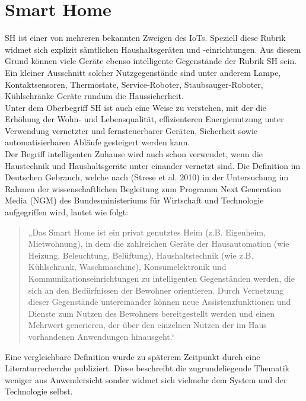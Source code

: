 \section{Smart Home}
\label{sec:smartHome}
\acl{SH} ist einer von mehreren bekannten Zweigen des \acs{IoT}s. Speziell diese Rubrik widmet sich explizit 
sämtlichen Haushaltsgeräten und -einrichtungen. Aus diesem Grund können viele Geräte ebenso intelligente Gegenstände 
der Rubrik \acl{SH} sein. Ein kleiner Ausschnitt solcher Nutzgegenstände sind unter anderem Lampe, Kontaktsensoren, 
Thermostate, Service-Roboter, Staubsauger-Roboter, Kühlschränke Geräte rundum die Haussicherheit. 
\\ 
Unter dem Oberbegriff \acl{SH} ist auch eine Weise zu verstehen, mit der die Erhöhung der Wohn- und Lebensqualität, 
effizienteren Energienutzung unter Verwendung vernetzter und fernsteuerbarer Geräten, Sicherheit sowie automatisierbaren 
Abläufe gesteigert werden kann. 
\\ 
Der Begriff intelligenten Zuhause wird auch schon verwendet, wenn die Haustechnik und Haushaltsgeräte unter einander  
vernetzt sind. Die Definition im Deutschen Gebrauch, welche nach (Strese et al. 2010) in der Untersuchung im Rahmen 
der wissenschaftlichen Begleitung zum Programm Next Generation Media (NGM) des Bundesministeriums für Wirtschaft und 
Technologie aufgegriffen wird, lautet wie folgt: 
\begin{quote}
    „Das Smart Home ist ein privat genutztes Heim (z.B. Eigenheim, Mietwohnung), in dem die zahlreichen Geräte der 
    Hausautomation (wie Heizung, Beleuchtung, Belüftung), Haushaltstechnik (wie z.B. Kühlschrank, Waschmaschine), 
    Konsumelektronik und Kommunikationseinrichtungen zu intelligenten Gegenständen werden, die sich an den 
    Bedürfnissen der Bewohner orientieren. Durch Vernetzung dieser Gegenstände untereinander können neue 
    Assistenzfunktionen und Dienste zum Nutzen des Bewohners bereitgestellt werden und einen Mehrwert 
    generieren, der über den einzelnen Nutzen der im Haus vorhandenen Anwendungen hinausgeht.“ \cite{strese.2010m}
\end{quote}
Eine vergleichbare Definition wurde zu späterem Zeitpunkt durch eine Literaturrecherche publiziert. Diese beschreibt 
die zugrundeliegende Thematik weniger aus Anwendersicht sonder widmet sich vielmehr dem System und der Technologie selbst. 


